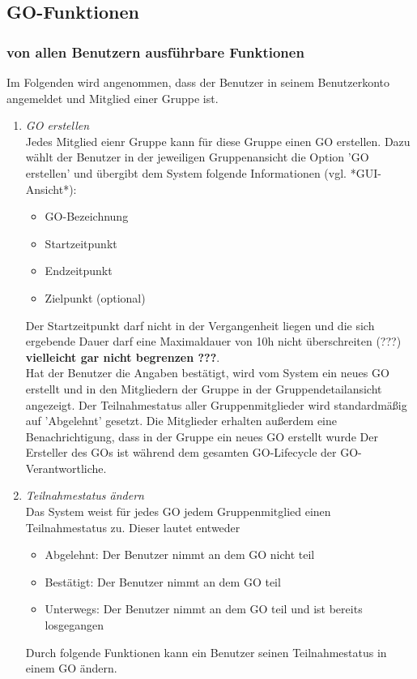 \documentclass[parskip=full]{scrartcl}
\def\threedigits#1{%
  \ifnum#1<100 0\fi
  \ifnum#1<10 0\fi
  \number#1}
\begin{document}
\subsection{GO-Funktionen}

\subsubsection{von allen Benutzern ausführbare Funktionen}
Im Folgenden wird angenommen, dass der Benutzer in seinem Benutzerkonto angemeldet und Mitglied einer Gruppe ist.

\begin{enumerate}[label={\textbf{/F\protect\threedigits{\theenumi}0/}}, leftmargin=*, resume]	
	\item \textit{GO erstellen} \\
	Jedes Mitglied eienr Gruppe kann für diese Gruppe einen GO erstellen. Dazu wählt der Benutzer in der jeweiligen Gruppenansicht die Option 'GO erstellen' und übergibt dem System folgende Informationen (vgl. *GUI-Ansicht*):
	\begin{itemize}
		\item GO-Bezeichnung
		\item Startzeitpunkt
		\item Endzeitpunkt 
		\item Zielpunkt (optional)
	\end{itemize}
Der Startzeitpunkt darf nicht in der Vergangenheit liegen und die sich ergebende Dauer darf eine Maximaldauer von 10h nicht überschreiten (???) \textbf{vielleicht gar nicht begrenzen ???}.\\
Hat der Benutzer die Angaben bestätigt, wird vom System ein neues GO erstellt und in den Mitgliedern der Gruppe in der Gruppendetailansicht angezeigt. Der Teilnahmestatus aller Gruppenmitglieder wird standardmäßig auf 'Abgelehnt' gesetzt. 
Die Mitglieder erhalten außerdem eine Benachrichtigung, dass in der Gruppe ein neues GO erstellt wurde %
Der Ersteller des GOs ist während dem gesamten GO-Lifecycle der GO-Verantwortliche.
	
	\item \textit{Teilnahmestatus ändern} \\
	Das System weist für jedes GO jedem Gruppenmitglied einen Teilnahmestatus zu. Dieser lautet entweder
	\begin{itemize}
		\item Abgelehnt: Der Benutzer nimmt an dem GO nicht teil
		\item Bestätigt: Der Benutzer nimmt an dem GO teil
		\item Unterwegs: Der Benutzer nimmt an dem GO teil und ist bereits losgegangen
	\end{itemize}
Durch folgende Funktionen kann ein Benutzer seinen Teilnahmestatus in einem GO ändern.


\end{enumerate}
\end{document}
